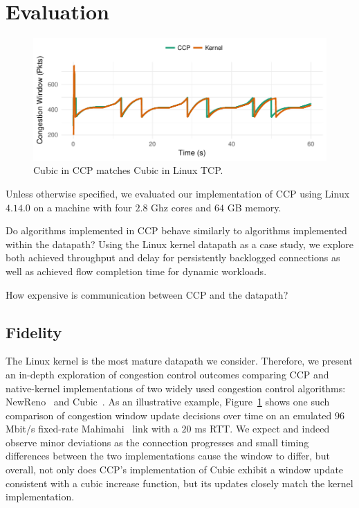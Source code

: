 \section{Evaluation}
\label{sec:eval}
\begin{figure}[t]
\centering
    \includegraphics[width=\columnwidth]{img/cubic-3-cwnd-evo-new}
    \caption{Cubic in CCP matches Cubic in Linux TCP.}\label{fig:eval:fidelity:time}
\end{figure}

\noindent
Unless otherwise specified, we evaluated our implementation of CCP using Linux $4.14.0$ on a machine with four $2.8$ Ghz cores and $64$ GB memory.

 Do algorithms implemented in CCP behave similarly to algorithms implemented within the datapath? Using the Linux kernel datapath as a case study, we explore both achieved throughput and delay for persistently backlogged connections as well as achieved flow completion time for dynamic workloads.

 How expensive is communication between CCP and the datapath?

\subsection{Fidelity}
\label{sec:eval:fidelity}

The Linux kernel is the most mature datapath we consider. Therefore, we present an in-depth exploration of congestion control outcomes comparing CCP and native-kernel implementations of two widely used congestion control algorithms: NewReno~\cite{newreno} and Cubic~\cite{cubic}.
As an illustrative example, Figure~\ref{fig:eval:fidelity:time} shows one such comparison of congestion window update decisions over time on an emulated $96$ Mbit/s fixed-rate Mahimahi~\cite{mahimahi} link with a $20$ ms RTT.
We expect and indeed observe minor deviations as the connection progresses and small timing differences between the two implementations cause the window to differ, but overall,
not only does CCP's implementation of Cubic exhibit a window update consistent with a cubic increase function, but its updates closely match the kernel implementation.

